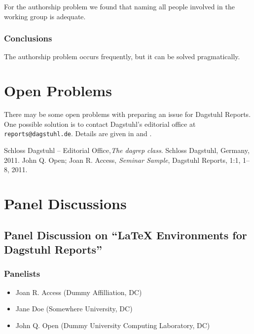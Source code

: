 \documentclass[a4paper,UKenglish]{dagrep}
\begin{document}
For the authorship problem we found that naming all people involved in the working group is adequate. 

\subsubsection{Conclusions}

The authorship problem occurs frequently, but it can be solved pragmatically.

\section{Open Problems}

\license

There may be some open problems with preparing an issue for Dagstuhl Reports. One possible solution is to contact Dagstuhl's editorial office at \texttt{reports@dagstuhl.de}.
Details are given in \cite{dagrep-manual2} and \cite{dagrep-sample2}.

\begin{thebibliography}{0}
 Schloss Dagstuhl -- Editorial Office,\textsl{The dagrep class}. Schloss Dagstuhl, Germany, 2011.
 John Q. Open; Joan R. Access, \textsl{Seminar Sample}, Dagstuhl Reports, 1:1, 1--8, 2011.
\end{thebibliography}


\section{Panel Discussions}

\subsection{Panel Discussion on ``LaTeX Environments for Dagstuhl Reports''}

\subsubsection{Panelists}

\begin{itemize}
\item Joan R. Access (Dummy Affilliation, DC)
\item Jane Doe (Somewhere University, DC)
\item John Q. Open (Dummy University Computing Laboratory, DC)
\end{itemize}
\end{document}
